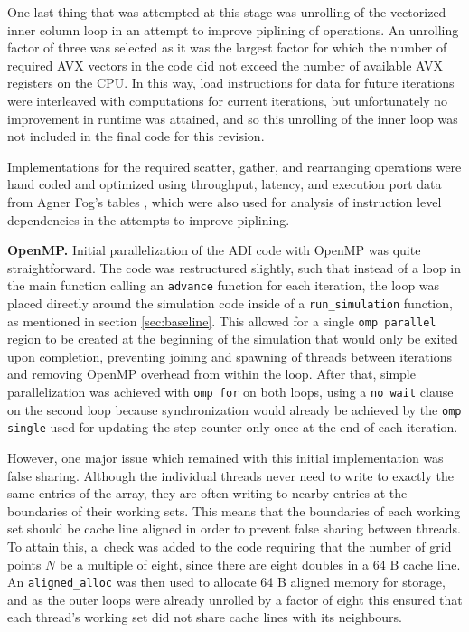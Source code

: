 \documentclass[letterpaper]{article}
\newcommand{\mypar}[1]{{\bf #1.}}
\begin{document}
One last thing that was attempted at this stage was unrolling of the vectorized inner column loop in an attempt to improve piplining of operations. An unrolling factor of three was selected as it was the largest factor for which the number of required AVX vectors in the code did not exceed the number of available AVX registers on the CPU. In this way, load instructions for data for future iterations were interleaved with computations for current iterations, but unfortunately no improvement in runtime was attained, and so this unrolling of the inner loop was not included in the final code for this revision.

Implementations for the required scatter, gather, and rearranging operations were hand coded and optimized using throughput, latency, and execution port data from Agner Fog's tables \cite{Agner}, which were also used for analysis of instruction level dependencies in the attempts to improve piplining.

\mypar{OpenMP}
Initial parallelization of the ADI code with OpenMP was quite straightforward. The code was restructured slightly, such that instead of a loop in the main function calling an {\tt advance} function for each iteration, the loop was placed directly around the simulation code inside of a {\tt run\_simulation} function, as mentioned in section \ref{sec:baseline}. This allowed for a single {\tt omp parallel} region to be created at the beginning of the simulation that would only be exited upon completion, preventing joining and spawning of threads between iterations and removing OpenMP overhead from within the loop. After that, simple parallelization was achieved with {\tt omp for} on both loops, using a {\tt no wait} clause on the second loop because synchronization would already be achieved by the {\tt omp single} used for updating the step counter only once at the end of each iteration.

However, one major issue which remained with this initial implementation was false sharing. Although the individual threads never need to write to exactly the same entries of the array, they are often writing to nearby entries at the boundaries of their working sets. This means that the boundaries of each working set should be cache line aligned in order to prevent false sharing between threads. To attain this, a~check was added to the code requiring that the number of grid points $N$ be a multiple of eight, since there are eight doubles in a 64 B cache line. An {\tt aligned\_alloc} was then used to allocate 64 B aligned memory for storage, and as the outer loops were already unrolled by a factor of eight this ensured that each thread's working set did not share cache lines with its neighbours.
\end{document}
